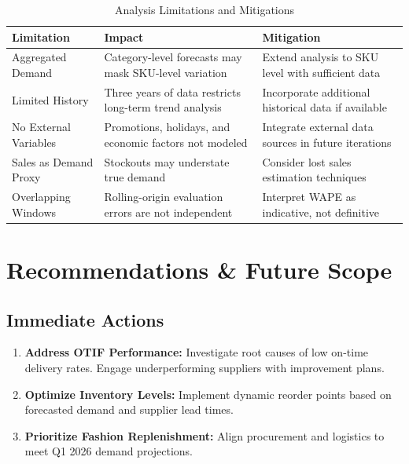 \documentclass[11pt,a4paper]{article}
\begin{document}
\begin{table}[H]
\centering
\caption{Analysis Limitations and Mitigations}
\label{tab:limitations}
\begin{tabularx}{\textwidth}{@{}lXX@{}}
\toprule
\textbf{Limitation} & \textbf{Impact} & \textbf{Mitigation} \\
\midrule
Aggregated Demand & Category-level forecasts may mask SKU-level variation & Extend analysis to SKU level with sufficient data \\
Limited History & Three years of data restricts long-term trend analysis & Incorporate additional historical data if available \\
No External Variables & Promotions, holidays, and economic factors not modeled & Integrate external data sources in future iterations \\
Sales as Demand Proxy & Stockouts may understate true demand & Consider lost sales estimation techniques \\
Overlapping Windows & Rolling-origin evaluation errors are not independent & Interpret WAPE as indicative, not definitive \\
\bottomrule
\end{tabularx}
\end{table}

\section{Recommendations \& Future Scope}

\subsection{Immediate Actions}

\begin{enumerate}[leftmargin=1.5em]
    \item \textbf{Address OTIF Performance:} Investigate root causes of low on-time delivery rates. Engage underperforming suppliers with improvement plans.
    \item \textbf{Optimize Inventory Levels:} Implement dynamic reorder points based on forecasted demand and supplier lead times.
    \item \textbf{Prioritize Fashion Replenishment:} Align procurement and logistics to meet Q1 2026 demand projections.
\end{enumerate}
\end{document}
